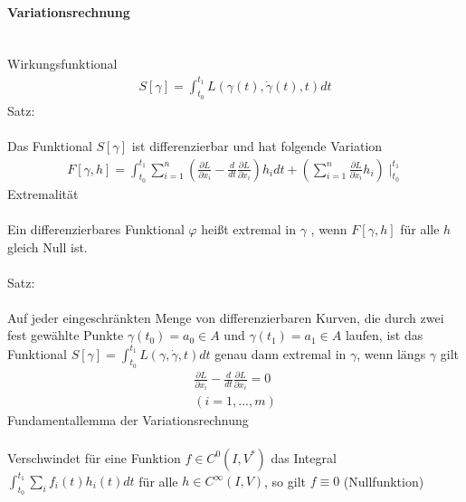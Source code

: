 \documentclass[10pt,a4paper]{article}
\begin{document}
\paragraph{Variationsrechnung} $\,$\\
\\
Wirkungsfunktional
\begin{align}
S[\gamma] = \int_{t_0}^{t_1} L(\gamma (t) , \dot{\gamma} (t), t) dt
\end{align}
Satz:\\
\\
Das Funktional $S[\gamma]$ ist differenzierbar und hat folgende Variation
\begin{align}
F[\gamma, h] = \int_{t_0}^{t_1} \sum_{i=1}^n (\frac{\partial L}{\partial x_i}-\frac{d}{dt} \frac{\partial L}{\partial \dot{x}_i})h_i dt + (\sum_{i=1}^n \frac{\partial L}{\partial \dot{x}_i} h_i) \mid_{t_0}^{t_1}
\end{align}
Extremalität\\
\\
Ein differenzierbares Funktional $\varphi$ heißt extremal in $\gamma$ , wenn $ F[\gamma,h] $ für alle $h$ gleich Null ist. \\
\\
Satz: \\
\\
Auf jeder eingeschränkten Menge von differenzierbaren Kurven, die durch zwei fest gewählte Punkte $\gamma (t_0)=a_0 \in A $ und $ \gamma (t_1)= a_1 \in A$ laufen, ist das Funktional $ S[\gamma]=\int_{t_0}^{t_1} L(\gamma, \dot{\gamma}, t)dt $ genau dann extremal in $\gamma$, wenn längs $\gamma$ gilt
\begin{align}
\frac{\partial L}{\partial x_i}- \frac{d}{dt} \frac{\partial L}{\partial \dot{x}_i} = 0\\
(i=1,...,m)
\end{align}
Fundamentallemma der Variationsrechnung\\
\\
Verschwindet für eine Funktion $ f \in C^0(I,V^*) $ das Integral $ \int_{t_0}^{t_1} \sum_i f_i(t) h_i(t) dt $ für alle $h \in C^{\infty}(I,V)$, so gilt $ f \equiv 0$  (Nullfunktion)
\end{document}
